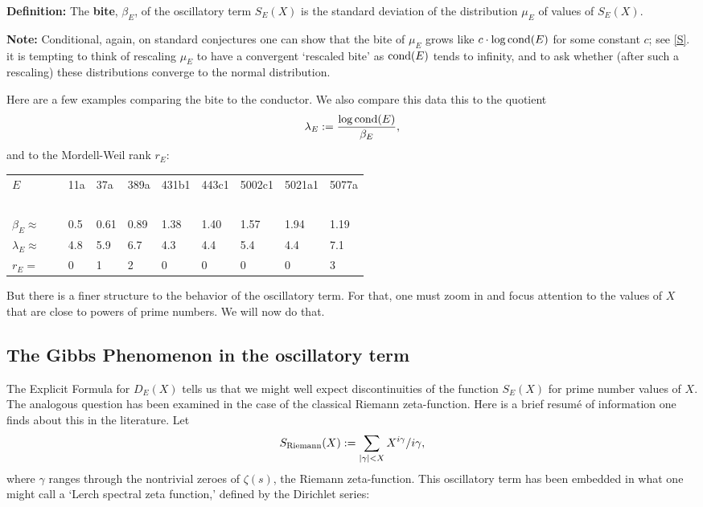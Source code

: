 \documentclass[11pt]{article}
\theoremstyle{plain}
\theoremstyle{definition}
\newtheorem{project}[theorem]{Project}
\numberwithin{equation}{section}
\numberwithin{figure}{section}
\numberwithin{table}{section}
\begin{document}
   {\bf Definition:}  The {\bf bite}, $\beta_E$, of the oscillatory term $S_E(X)$ is the standard deviation of the   distribution $\mu_E$ of values of $S_E(X)$.

    {\bf  Note: } Conditional, again,  on standard conjectures  one can show that the bite of $\mu_E$  grows like $c\cdot \log {\rm cond}(E)$ for some constant $c$; see \ref{S}. it is tempting to think of rescaling $\mu_E$ to have a convergent `rescaled bite' as ${\rm cond}(E)$ tends to infinity, and to ask whether (after such a rescaling) these distributions converge to the normal distribution.

 Here are a few examples comparing the bite to the conductor. We also compare this data this to the quotient $$\lambda_E:={\frac{ \log {\rm cond}(E)}{\beta_E}},$$ and to the Mordell-Weil rank $r_E$:



  \begin{tabular}{llllllllll}
  $E$   &\ & 11a & 37a & 389a & 431b1 & 443c1 & 5002c1 & 5021a1 & 5077a\\
\  &\ &\  &\  &\  &\ &\ &\ &\ &\ \\
  $\beta_E \approx $  &\ & 0.5 & 0.61 & 0.89 & 1.38 & 1.40 & 1.57 & 1.94 & 1.19\\
  $\lambda_E  \approx$  &\ & 4.8 & 5.9 & 6.7 & 4.3 & 4.4 & 5.4 & 4.4 & 7.1\\
  $r_E =$   &\ & 0 & 1 & 2 & 0 & 0 & 0 & 0 & 3 \end{tabular}
\vskip10pt

  But there is a finer structure to the behavior of the oscillatory term. For that, one must zoom in and focus attention to the values of $X$ that are close to powers of prime numbers. We will now do that.


 \subsection{ The Gibbs Phenomenon in the oscillatory term} The Explicit Formula for $D_E(X)$ tells us that we might well expect discontinuities of the function $S_E(X)$ for prime number values of $X$. The analogous question has been  examined in the case of the classical Riemann zeta-function.  Here is a brief resum{\'e} of information one finds about this in the literature. Let $$S_{\rm Riemann}(X): = \sum_{|\gamma|<X}X^{i\gamma}/i\gamma,$$ where $\gamma$ ranges through the nontrivial zeroes of $\zeta(s)$, the Riemann zeta-function. This oscillatory term has been  embedded in what one might call a `Lerch spectral zeta function,' defined by the Dirichlet series:
\end{document}
